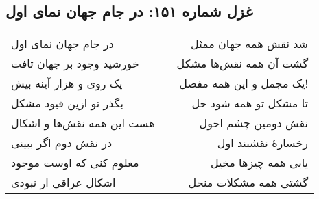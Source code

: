 \begin{center}
\section*{غزل شماره ۱۵۱: در جام جهان نمای اول}
\label{sec:151}
\begin{longtable}{l p{0.5cm} r}
در جام جهان نمای اول
&&
شد نقش همه جهان ممثل
\\
خورشید وجود بر جهان تافت
&&
گشت آن همه نقش‌ها مشکل
\\
یک روی و هزار آینه بیش
&&
یک مجمل و این همه مفصل!
\\
بگذر تو ازین قیود مشکل
&&
تا مشکل تو همه شود حل
\\
هست این همه نقش‌ها و اشکال
&&
نقش دومین چشم احول
\\
در نقش دوم اگر ببینی
&&
رخسارهٔ نقشبند اول
\\
معلوم کنی که اوست موجود
&&
یابی همه چیزها مخیل
\\
اشکال عراقی ار نبودی
&&
گشتی همه مشکلات منحل
\\
\end{longtable}
\end{center}
